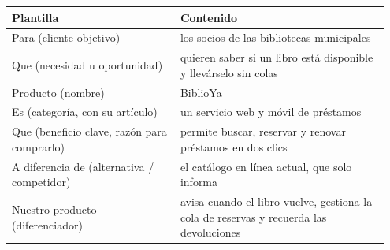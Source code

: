 \documentclass[11pt,a4paper]{article}
\begin{document}
{\small
\begin{longtable}{@{}>{\raggedright\arraybackslash}p{0.421\linewidth}>{\raggedright\arraybackslash}p{0.528\linewidth}@{}}
\toprule
\textbf{Plantilla} & \textbf{Contenido} \\
\midrule
\endhead
Para (cliente objetivo) & los socios de las bibliotecas municipales \\
Que (necesidad u oportunidad) & quieren saber si un libro está disponible y llevárselo sin colas \\
Producto (nombre) & BiblioYa \\
Es (categoría, con su artículo) & un servicio web y móvil de préstamos \\
Que (beneficio clave, razón para comprarlo) & permite buscar, reservar y renovar préstamos en dos clics \\
A diferencia de (alternativa / competidor) & el catálogo en línea actual, que solo informa \\
Nuestro producto (diferenciador) & avisa cuando el libro vuelve, gestiona la cola de reservas y recuerda las devoluciones \\
\bottomrule
\end{longtable}}
\end{document}
